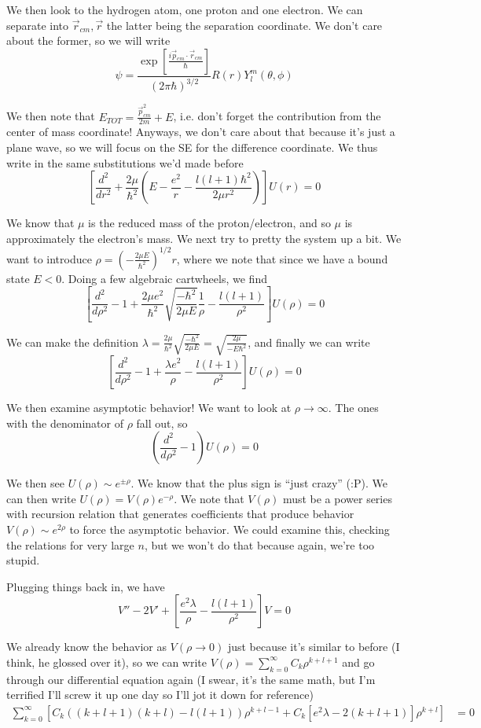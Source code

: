 \documentclass[10pt]{report}
\newcommand{\rtd}[2]{\frac{d^2#1}{d#2^2}}
\begin{document}
We then look to the hydrogen atom, one proton and one electron. We can separate into $\vec{r}_{cm}, \vec{r}$ the latter being the separation coordinate. We don't care about the former, so we will write
$$\psi = \frac{\exp \left[ \frac{i\vec{p}_{cm} \cdot \vec{r}_{cm}}{\hbar} \right]}{(2\pi \hbar)^{3/2}}R(r)Y_l^m(\theta,\phi)$$

We then note that $E_{TOT} = \frac{\vec{p}_{cm}^2}{2m} + E$, i.e. don't forget the contribution from the center of mass coordinate! Anyways, we don't care about that because it's just a plane wave, so we will focus on the SE for the difference coordinate. We thus write in the same substitutions we'd made before
$$\left[\rtd{}{r} + \frac{2\mu}{\hbar^2}\left( E-\frac{e^2}{r} - \frac{l(l+1)\hbar^2}{2\mu r^2} \right)\right]U(r) = 0$$

We know that $\mu$ is the reduced mass of the proton/electron, and so $\mu$ is approximately the electron's mass. We next try to pretty the system up a bit. We want to introduce $\rho = \left( -\frac{2\mu E}{\hbar^2} \right)^{1/2}r$, where we note that since we have a bound state $E < 0$. Doing a few algebraic cartwheels, we find
$$\left[ \rtd{}{\rho} - 1 + \frac{2\mu e^2}{\hbar^2} \sqrt{\frac{-\hbar^2}{2\mu E}}\frac{1}{\rho} - \frac{l(l+1)}{\rho^2} \right]U(\rho) = 0$$

We can make the definition $\lambda = \frac{2\mu }{\hbar^2} \sqrt{\frac{-\hbar^2}{2\mu E}} = \sqrt{\frac{2\mu}{-E\hbar^2}}$, and finally we can write
$$\left[ \rtd{}{\rho} - 1 + \frac{\lambda e^2}{\rho} - \frac{l(l+1)}{\rho^2} \right]U(\rho) = 0$$

We then examine asymptotic behavior! We want to look at $\rho \to \infty$. The ones with the denominator of $\rho$ fall out, so
$$\left( \rtd{}{\rho} - 1 \right) U(\rho) = 0$$

We then see $U(\rho) \sim e^{\pm \rho}$. We know that the plus sign is ``just crazy'' (:P). We can then write $U(\rho) = V(\rho) e^{-\rho}$. We note that $V(\rho)$ must be a power series with recursion relation that generates coefficients that produce behavior $V(\rho) \sim e^{2\rho}$ to force the asymptotic behavior. We could examine this, checking the relations for very large $n$, but we won't do that because again, we're too stupid.

Plugging things back in, we have
$$V'' - 2V' + \left[ \frac{e^2\lambda}{\rho} - \frac{l(l+1)}{\rho^2} \right]V = 0$$

We already know the behavior as $V(\rho \to 0)$ just because it's similar to before (I think, he glossed over it), so we can write $V(\rho) = \sum_{k = 0}^{\infty} C_k \rho^{k+l+1}$ and go through our differential equation again (I swear, it's the same math, but I'm terrified I'll screw it up one day so I'll jot it down for reference)
\begin{align*}
    \sum_{k=0}^\infty \left[ C_k \left( (k+l+1)(k+l)  - l(l+1) \right)\rho^{k+l-1} + C_k\left[ e^2\lambda - 2(k+l+1) \right]\rho^{k+l}\right] &= 0
\end{align*}
\end{document}
